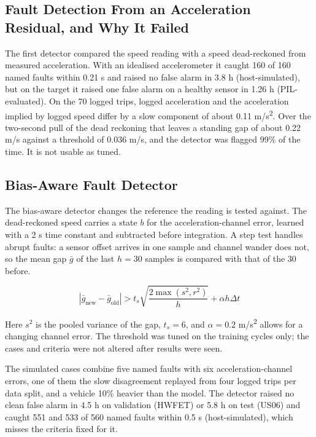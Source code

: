 \documentclass{ieeeaccess}
\begin{document}
\subsection{Fault Detection From an Acceleration Residual, and Why It Failed}

The first detector compared the speed reading with a speed dead-reckoned from measured acceleration. With an idealised accelerometer it caught 160 of 160 named faults within 0.21 s and raised no false alarm in 3.8 h (host-simulated), but on the target it raised one false alarm on a healthy sensor in 1.26 h (PIL-evaluated). On the 70 logged trips, logged acceleration and the acceleration implied by logged speed differ by a slow component of about 0.11 m/s\textsuperscript{2}. Over the two-second pull of the dead reckoning that leaves a standing gap of about 0.22 m/s against a threshold of 0.036 m/s, and the detector was flagged 99\% of the time. It is not usable as tuned.

\subsection{Bias-Aware Fault Detector}

The bias-aware detector changes the reference the reading is tested against. The dead-reckoned speed carries a state $b$ for the acceleration-channel error, learned with a 2 s time constant and subtracted before integration. A step test handles abrupt faults: a sensor offset arrives in one sample and channel wander does not, so the mean gap $\bar{g}$ of the last $h = 30$ samples is compared with that of the 30 before.

\begin{equation}
\label{eq:estimation-step}
\left| \bar{g}_{\text{new}} - \bar{g}_{\text{old}} \right| > t_{s} \sqrt{\frac{2 \max(s^{2}, r^{2})}{h}} + \alpha h \Delta t
\end{equation}

Here $s^{2}$ is the pooled variance of the gap, $t_{s} = 6$, and $\alpha = 0.2$ m/s\textsuperscript{2} allows for a changing channel error. The threshold was tuned on the training cycles only; the cases and criteria were not altered after results were seen.

The simulated cases combine five named faults with six acceleration-channel errors, one of them the slow disagreement replayed from four logged trips per data split, and a vehicle 10\% heavier than the model. The detector raised no clean false alarm in 4.5 h on validation (HWFET) or 5.8 h on test (US06) and caught 551 and 533 of 560 named faults within 0.5 s (host-simulated), which misses the criteria fixed for it.
\end{document}
